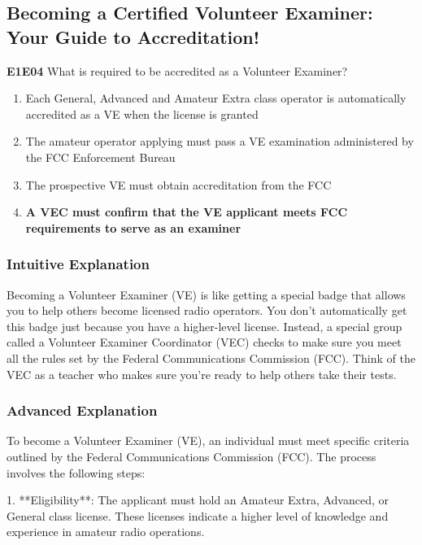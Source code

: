 \subsection{Becoming a Certified Volunteer Examiner: Your Guide to Accreditation!}

\begin{tcolorbox}[colback=gray!10!white,colframe=black!75!black,title=E1E04]
\textbf{E1E04} What is required to be accredited as a Volunteer Examiner?
\begin{enumerate}[label=\Alph*]
    \item Each General, Advanced and Amateur Extra class operator is automatically accredited as a VE when the license is granted
    \item The amateur operator applying must pass a VE examination administered by the FCC Enforcement Bureau
    \item The prospective VE must obtain accreditation from the FCC
    \item \textbf{A VEC must confirm that the VE applicant meets FCC requirements to serve as an examiner}
\end{enumerate}
\end{tcolorbox}

\subsubsection{Intuitive Explanation}
Becoming a Volunteer Examiner (VE) is like getting a special badge that allows you to help others become licensed radio operators. You don’t automatically get this badge just because you have a higher-level license. Instead, a special group called a Volunteer Examiner Coordinator (VEC) checks to make sure you meet all the rules set by the Federal Communications Commission (FCC). Think of the VEC as a teacher who makes sure you’re ready to help others take their tests.

\subsubsection{Advanced Explanation}
To become a Volunteer Examiner (VE), an individual must meet specific criteria outlined by the Federal Communications Commission (FCC). The process involves the following steps:

1. **Eligibility**: The applicant must hold an Amateur Extra, Advanced, or General class license. These licenses indicate a higher level of knowledge and experience in amateur radio operations.

